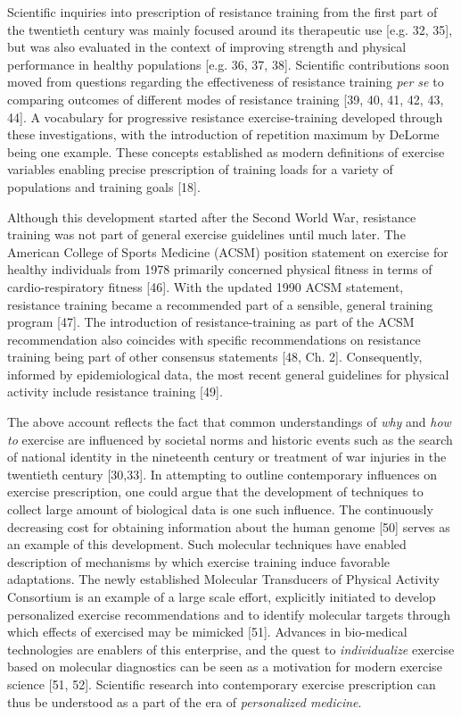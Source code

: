 \documentclass[twoside,10pt]{gihclass} %
\begin{document}
Scientific inquiries into prescription of resistance training from the first part of the twentieth century was mainly focused around its therapeutic use
{[}e.g. 32, 35{]},
but was also evaluated in the context of improving strength and physical performance in healthy populations
{[}e.g. 36, 37, 38{]}.
Scientific contributions soon moved from questions regarding the effectiveness of resistance training \emph{per se} to comparing outcomes of different modes of resistance training
{[}39, 40, 41, 42, 43, 44{]}.
A vocabulary for progressive resistance exercise-training developed through these investigations, with
the introduction of repetition maximum by DeLorme being one example. These concepts established as modern definitions of exercise variables enabling precise prescription of training loads for a variety of populations and training goals
{[}18{]}.

Although this development started after the Second World War, resistance training was not part of general exercise guidelines until much later.
The American College of Sports Medicine (ACSM) position statement on exercise for healthy individuals from 1978 primarily concerned physical fitness in terms of cardio-respiratory fitness
{[}46{]}.
With the updated 1990 ACSM statement, resistance training became a recommended part of a sensible, general training program
{[}47{]}.
The introduction of resistance-training as part of the ACSM recommendation also coincides with specific recommendations on resistance training being part of other consensus statements
{[}48, Ch. 2{]}.
Consequently, informed by epidemiological data, the most recent general guidelines for physical activity include resistance training {[}49{]}.

The above account reflects the fact that common understandings of \emph{why} and \emph{how to} exercise are influenced by societal norms and historic events such as the search of national identity in the nineteenth century or treatment of war injuries in the twentieth century
{[}30,33{]}.
In attempting to outline contemporary influences on exercise prescription, one could argue that the development of techniques to collect large amount of biological data is one such influence. The continuously decreasing cost for obtaining information about the human genome
{[}50{]} serves as an example of this development.
Such molecular techniques have enabled description of mechanisms by which exercise training induce favorable adaptations. The newly established Molecular Transducers of Physical Activity Consortium is an example of a large scale effort, explicitly initiated to develop personalized exercise recommendations and to identify molecular targets through which effects of exercised may be mimicked
{[}51{]}.
Advances in bio-medical technologies are enablers of this enterprise, and the quest to \emph{individualize} exercise based on molecular diagnostics can be seen as a motivation for modern exercise science
{[}51, 52{]}.
Scientific research into contemporary exercise prescription can thus be understood as a part of the era of \emph{personalized medicine}.
\end{document}
